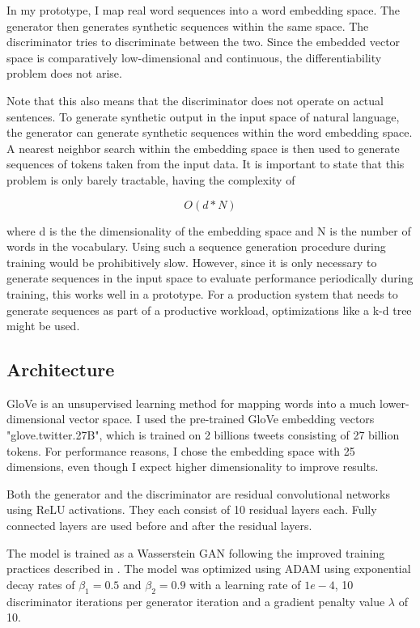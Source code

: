 \documentclass[a4paper,conference]{IEEEtran}
\begin{document}
In my prototype, I map real word sequences into a word embedding space. The generator then generates synthetic sequences within the same space. The discriminator tries to discriminate between the two. Since the embedded vector space is comparatively low-dimensional and continuous, the differentiability problem does not arise.

Note that this also means that the discriminator does not operate on actual sentences. To generate synthetic output in the input space of natural language, the generator can generate synthetic sequences within the word embedding space. A nearest neighbor search within the embedding space is then used to generate sequences of tokens taken from the input data. It is important to state that this problem is only barely tractable, having the complexity of

\begin{dmath}
O(d * N)
\end{dmath}

where d is the the dimensionality of the embedding space and N is the number of words in the vocabulary. Using such a sequence generation procedure during training would be prohibitively slow. However, since it is only necessary to generate sequences in the input space to evaluate performance periodically during training, this works well in a prototype. For a production system that needs to generate sequences as part of a productive workload, optimizations like a k-d tree might be used.

\subsection{Architecture}
GloVe \cite{c30} is an unsupervised learning method for mapping words into a much lower-dimensional vector space. I used the pre-trained GloVe embedding vectors "glove.twitter.27B", which is trained on 2 billions tweets consisting of 27 billion tokens. For performance reasons, I chose the embedding space with 25 dimensions, even though I expect higher dimensionality to improve results.

Both the generator and the discriminator are residual \cite{c32} convolutional networks using ReLU activations. They each consist of 10 residual layers each. Fully connected layers are used before and after the residual layers.

The model is trained as a Wasserstein GAN following the improved training practices described in \cite{c21}. The model was optimized using ADAM \cite{c16} using exponential decay rates of $\beta_1 = 0.5$ and $\beta_2 = 0.9$ with a learning rate of $1e-4$, 10 discriminator iterations per generator iteration and a gradient penalty value $\lambda$ of 10. 
\end{document}
